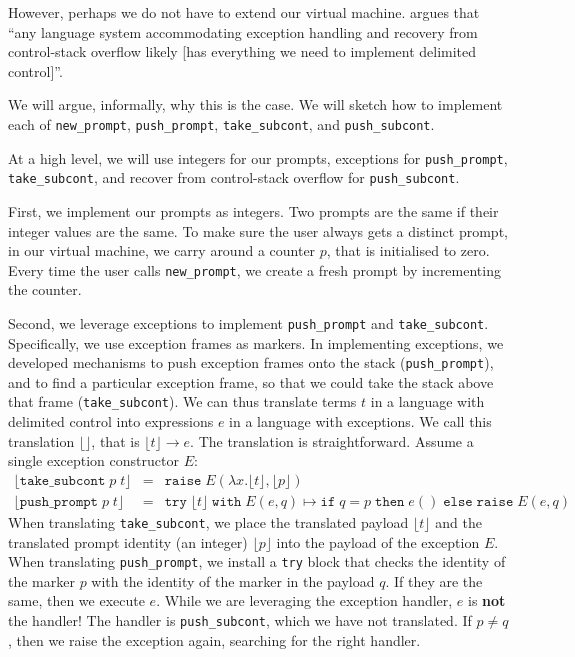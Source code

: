 However, perhaps we do not have to extend our virtual machine. \citet{kisyelov-2014} argues that ``any language system accommodating exception handling and recovery from control-stack overflow likely [has everything we need to implement delimited control]''.

We will argue, informally, why this is the case. We will sketch how to implement each of \texttt{new\_prompt}, \texttt{push\_prompt}, \texttt{take\_subcont}, and \texttt{push\_subcont}. 

At a high level, we will use integers for our prompts, exceptions for \texttt{push\_prompt}, \texttt{take\_subcont}, and recover from control-stack overflow for \texttt{push\_subcont}. 

First, we implement our prompts as integers. Two prompts are the same if their integer values are the same. To make sure the user always gets a distinct prompt, in our virtual machine, we carry around a counter $p$, that is initialised to zero. Every time the user calls \texttt{new\_prompt}, we create a fresh prompt by incrementing the counter.

Second, we leverage exceptions to implement \texttt{push\_prompt} and \texttt{take\_subcont}. Specifically, we use exception frames as markers. In implementing exceptions, we developed mechanisms to push exception frames onto the stack (\texttt{push\_prompt}), and to find a particular exception frame, so that we could take the stack above that frame (\texttt{take\_subcont}). We can thus translate terms $t$ in a language with delimited control into expressions $e$ in a language with exceptions. We call this translation $\lfloor \rfloor$, that is $\lfloor t \rfloor \to e$. The translation is straightforward. Assume a single exception constructor $E$:
\[\begin{array}{lll}
    \lfloor \texttt{take\_subcont} \; p \; t \rfloor & = & \texttt{raise} \; E(\lambda x. \lfloor t \rfloor, \lfloor p \rfloor) \\
     \lfloor \texttt{push\_prompt} \; p \; t \rfloor & = & \texttt{try} \; \lfloor t \rfloor \; \texttt{with} \; E(e, q) \mapsto \texttt{if}\; q = p \;\texttt{then} \; e () \; \texttt{else} \; \texttt{raise}\; E(e, q)
\end{array}\]
When translating \texttt{take\_subcont}, we place the translated payload $\lfloor t \rfloor$ and the translated prompt identity (an integer) $\lfloor p \rfloor$ into the payload of the exception $E$. When translating \texttt{push\_prompt}, we install a \texttt{try} block that checks the identity of the marker $p$ with the identity of the marker in the payload $q$. If they are the same, then we execute $e$. While we are leveraging the exception handler, $e$ is \textbf{not} the handler! The handler is \texttt{push\_subcont}, which we have not translated. If $p \neq q$, then we raise the exception again, searching for the right handler.

